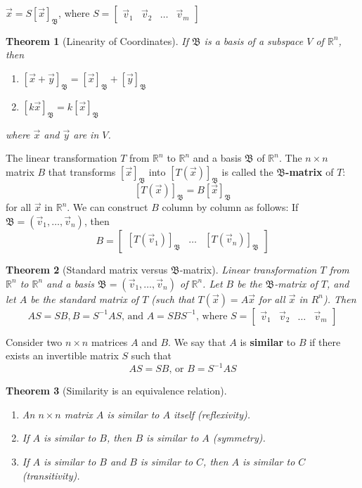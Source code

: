 \documentclass[letter]{article}
\newcommand{\R}{\mathbb{R}}
\newcommand{\B}{\mathfrak{B}}
\newtheorem{theorem}{Theorem}[section]
\newenvironment{definition}[1][Definition]{\begin{trivlist}
\item[\hskip \labelsep {\bfseries #1}]}{\end{trivlist}}
\begin{document}
$\vec x = S [\vec x]_\B$, where $S = \begin{bmatrix}
\vec v_1 & \vec v_2 & \ldots & \vec v_m
\end{bmatrix}$

\begin{theorem}[Linearity of Coordinates]
If $\B$ is a basis of a subspace $V$ of $\R^n$, then
\begin{enumerate}
\item $[\vec x + \vec y]_\B = [\vec x]_\B+[\vec y]_\B$
\item $[k \vec x]_\B = k [\vec x]_\B$
\end{enumerate}
where $\vec x$ and $\vec y$ are in $V$.
\end{theorem}

\begin{definition}
The linear transformation $T$ from $\R^n$ to $\R^n$ and a basis $\B$ of $\R^n$. The $n\times n$ matrix $B$ that transforms $[\vec x]_\B$ into $[T(\vec x)]_\B$ is called the \textbf{$\B$-matrix} of $T$:
\[
[T(\vec x)]_\B = B[\vec x]_\B
\]
for all $\vec x$ in $\R^n$. We can construct $B$ column by column as follows: If $\B = (\vec v_1, \ldots, \vec v_n)$, then
\[
B =  \begin{bmatrix}
[T(\vec v_1)]_\B & \ldots & [T(\vec v_n)]_\B
\end{bmatrix}
\]
\end{definition}
\begin{theorem}[Standard matrix versus $\B$-matrix]
Linear transformation $T$ from $\R^n$ to $\R^n$ and a basis $\B = (\vec v_1, \ldots, \vec v_n)$ of $\R^n$. Let $B$ be the $\B$-matrix of $T$, and let $A$ be the standard matrix of $T$ (such that $T(\vec x) = A\vec x$ for all $\vec x$ in $R^n$). Then
\[
AS = SB, B=S^{-1}AS\text{, and }A = SBS^{-1}\text{, where }S = \begin{bmatrix}
\vec v_1 & \vec v_2 & \ldots & \vec v_m
\end{bmatrix}
\]
\end{theorem}
\begin{definition}
Consider two $n\times n$ matrices $A$ and $B$. We say that $A$ is \textbf{similar} to $B$ if there exists an invertible matrix $S$ such that
\[
AS = SB\text{, or }B = S^{-1}AS
\]
\end{definition}

\begin{theorem}[Similarity is an equivalence relation]
\begin{enumerate}
\item An $n\times n$ matrix $A$ is similar to $A$ itself (reflexivity).
\item If $A$ is similar to $B$, then $B$ is similar to $A$ (symmetry).
\item If $A$ is similar to $B$ and $B$ is similar to $C$, then $A$ is similar to $C$ (transitivity).
\end{enumerate}
\end{theorem}
\end{document}
